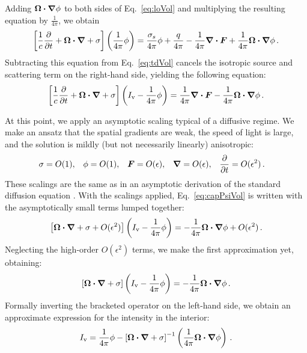 Adding $\bm{\Omega}\bm{\cdot} \bm{\nabla} \phi$ to both sides of Eq.~\eqref{eq:loVol} and
multiplying the resulting equation by $\frac{1}{4\pi}$, we obtain
\begin{align*}
  \left[ \frac{1}{c}\frac{\partial }{\partial t}
  + \bm{\Omega}\bm{\cdot} \bm{\nabla}
  + \sigma \right]
  \left( \frac{1}{4\pi} \phi \right)
  = \frac{\sigma_s}{4\pi}
  \phi + \frac{q}{4\pi} - \frac{1}{4\pi} \bm{\nabla} \bm{\cdot}\bm{F} 
  + \frac{1}{4\pi} \bm{\Omega}\bm{\cdot} \bm{\nabla} \phi\,.
\end{align*}
Subtracting this equation from Eq.~\eqref{eq:tdVol} cancels the isotropic source
and scattering term on the right-hand side, yielding the following equation:
\begin{equation}\label{eq:capPsiVol}
  \left[ \frac{1}{c}\frac{\partial }{\partial t}
  + \bm{\Omega}\bm{\cdot} \bm{\nabla}
  + \sigma \right]
   \left( I_\mathrm{v}
  - \frac{1}{4\pi} \phi \right)
  = \frac{1}{4\pi} \bm{\nabla} \bm{\cdot}\bm{F} -
  \frac{1}{4\pi} \bm{\Omega}\bm{\cdot} \bm{\nabla} \phi\,.
\end{equation}

At this point, we apply an asymptotic scaling typical of a diffusive regime.
We make an ansatz that the spatial gradients are weak, the speed of light is
large, and the solution is mildly (but not necessarily linearly) anisotropic:
\begin{align} \label{eq:ansatz}
  \sigma &= O(1), &
  \phi &= O(1), &
  \bm{F} &= O(\epsilon), &
  \bm{\nabla} &= O(\epsilon), &
  \frac{\partial }{\partial t} &= O(\epsilon^2) \,.
\end{align}
These scalings are the same as in an asymptotic derivation of the standard
diffusion equation \cite{Lar1975,Mor2000}. With the scalings applied,
Eq.~\eqref{eq:capPsiVol} is written with the asymptotically small terms lumped
together:
\begin{equation*}
  \left[\bm{\Omega}\bm{\cdot} \bm{\nabla}
  + \sigma + O(\epsilon^2) \right]
   \left( I_\mathrm{v}
  - \frac{1}{4\pi} \phi \right)
  = - \frac{1}{4\pi} \bm{\Omega}\bm{\cdot} \bm{\nabla} \phi + O(\epsilon^2)\,.
\end{equation*}
Neglecting the high-order $O(\epsilon^2)$ terms, we make the first approximation
yet, obtaining:
\begin{equation*}
  \left[\bm{\Omega}\bm{\cdot} \bm{\nabla}  + \sigma \right]
   \left( I_\mathrm{v}
  - \frac{1}{4\pi} \phi \right)
  = - \frac{1}{4\pi} \bm{\Omega}\bm{\cdot} \bm{\nabla} \phi \,.
\end{equation*}
Formally inverting the bracketed operator on the left-hand side, we obtain an
approximate expression for the intensity in the interior:
\begin{equation}\label{eq:tdVolApprox1}
  I_\mathrm{v} = \frac{1}{4\pi} \phi - 
  \left[\bm{\Omega}\bm{\cdot} \bm{\nabla}  + \sigma \right]^{-1}
  \left( \frac{1}{4\pi} \bm{\Omega}\bm{\cdot} \bm{\nabla} \phi \right)\,.
\end{equation}

